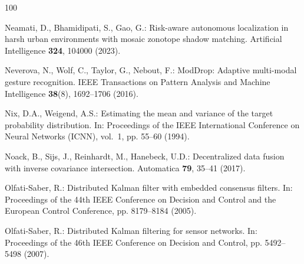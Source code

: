\documentclass[graybox,envcountchap]{style/SNmono}
\begin{document}
\begin{thebibliography}{100}
{\par}

Neamati, D., Bhamidipati, S., Gao, G.: Risk-aware autonomous localization in
  harsh urban environments with mosaic zonotope shadow matching.
\newblock Artificial Intelligence \textbf{324}, 104000 (2023).
\newblock {}



Neverova, N., Wolf, C., Taylor, G., Nebout, F.: {ModDrop}: Adaptive multi-modal
  gesture recognition.
\newblock IEEE Transactions on Pattern Analysis and Machine Intelligence
  \textbf{38}(8), 1692--1706 (2016).
\newblock {}



Nix, D.A., Weigend, A.S.: Estimating the mean and variance of the target
  probability distribution.
\newblock In: Proceedings of the IEEE International Conference on Neural
  Networks (ICNN), vol.~1, pp. 55--60 (1994).
\newblock {}



Noack, B., Sijs, J., Reinhardt, M., Hanebeck, U.D.: Decentralized data fusion
  with inverse covariance intersection.
\newblock Automatica \textbf{79}, 35--41 (2017).
\newblock {}



Olfati-Saber, R.: Distributed {K}alman filter with embedded consensus filters.
\newblock In: Proceedings of the 44th IEEE Conference on Decision and Control
  and the European Control Conference, pp. 8179--8184 (2005).
\newblock {}



Olfati-Saber, R.: Distributed {K}alman filtering for sensor networks.
\newblock In: Proceedings of the 46th IEEE Conference on Decision and Control,
  pp. 5492--5498 (2007).
\newblock {}



\end{thebibliography}
\end{document}
